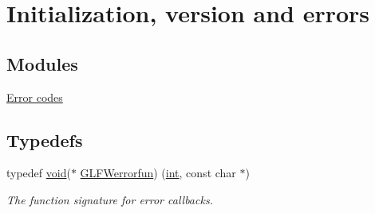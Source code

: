 \hypertarget{group__init}{}\section{Initialization, version and errors}
\label{group__init}
\subsection*{Modules}
\begin{DoxyCompactItemize}
\item 
\hyperlink{group__errors}{Error codes}
\end{DoxyCompactItemize}
\subsection*{Typedefs}
\begin{DoxyCompactItemize}
\item 
typedef \hyperlink{wglew_8h_aeea6e3dfae3acf232096f57d2d57f084}{void}($\ast$ \hyperlink{group__init_ga6b8a2639706d5c409fc1287e8f55e928}{G\+L\+F\+Werrorfun}) (\hyperlink{wglew_8h_a500a82aecba06f4550f6849b8099ca21}{int}, const char $\ast$)
\begin{DoxyCompactList}\small\item\em The function signature for error callbacks. \end{DoxyCompactList}\end{DoxyCompactItemize}
